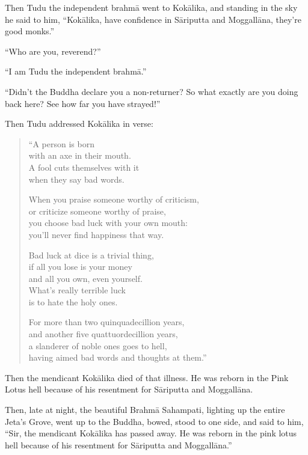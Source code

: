 \documentclass[12pt,openany]{book}%
\begin{document}
Then Tudu the independent \textsanskrit{brahmā} went to \textsanskrit{Kokālika}, and standing in the sky he said to him, “\textsanskrit{Kokālika}, have confidence in \textsanskrit{Sāriputta} and \textsanskrit{Moggallāna}, they’re good monks.” 

“Who are you, reverend?” 

“I am Tudu the independent \textsanskrit{brahmā}.” 

“Didn’t the Buddha declare you a non-returner? So what exactly are you doing back here? See how far you have strayed!” 

Then Tudu addressed \textsanskrit{Kokālika} in verse: 

\begin{verse}%
“A person is born \\
with an axe in their mouth. \\
A fool cuts themselves with it \\
when they say bad words. 

When you praise someone worthy of criticism, \\
or criticize someone worthy of praise, \\
you choose bad luck with your own mouth: \\
you’ll never find happiness that way. 

Bad luck at dice is a trivial thing, \\
if all you lose is your money \\
and all you own, even yourself. \\
What’s really terrible luck \\
is to hate the holy ones. 

For more than two quinquadecillion years, \\
and another five quattuordecillion years, \\
a slanderer of noble ones goes to hell, \\
having aimed bad words and thoughts at them.” 

%
\end{verse}

Then the mendicant \textsanskrit{Kokālika} died of that illness. He was reborn in the Pink Lotus hell because of his resentment for \textsanskrit{Sāriputta} and \textsanskrit{Moggallāna}. 

Then, late at night, the beautiful \textsanskrit{Brahmā} Sahampati, lighting up the entire Jeta’s Grove, went up to the Buddha, bowed, stood to one side, and said to him, “Sir, the mendicant \textsanskrit{Kokālika} has passed away. He was reborn in the pink lotus hell because of his resentment for \textsanskrit{Sāriputta} and \textsanskrit{Moggallāna}.” 
\end{document}
